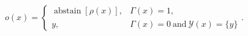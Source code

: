 \begin{equation}
o(x)=\begin{cases}
\operatorname{abstain}[\rho(x)], & \Gamma(x)=1,\\
y, & \Gamma(x)=0\ \text{and}\ \mathcal{Y}(x)=\{y\}
\end{cases}.
\label{eq:guarded_abstention_policy}
\tag{6}
\end{equation}
